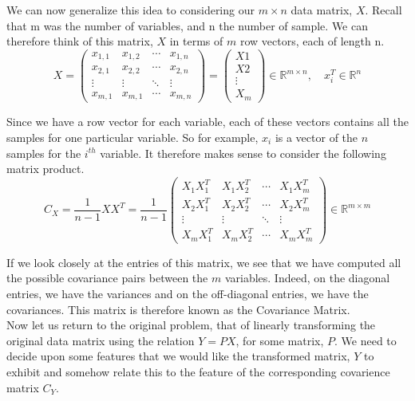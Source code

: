 \begin{appendix}
We can now generalize this idea to considering our $m \times n$ data matrix, $X$. Recall that m was the number of variables, and n the number of sample. We can therefore think of this matrix, $X$ in terms of $m$ row vectors, each of length n.\\
\begin{equation*}
X
=
\begin{pmatrix}
x_{1,1}&x_{1,2}&\cdots&x_{1,n}\\
x_{2,1}&x_{2,2}&\cdots&x_{2,n}\\
\vdots&\vdots&\ddots&\vdots\\
x_{m,1}&x_{m,1}&\cdots&x_{m,n}
\end{pmatrix} 
=
\begin{pmatrix}
X1\\
X2\\
\vdots\\
X_{m}
\end{pmatrix}
\in \mathbb{R}^{m\times n},\quad x_{i}^{T} \in \mathbb{R}^{n}
\end{equation*}

Since we have a row vector for each variable, each of these vectors contains all the samples for one particular variable. So for example, $x_{i}$ is a vector of the $n$ samples for the $i^{th}$ variable. It therefore makes sense to consider the following matrix product.\\
\begin{equation*}
C_{X}=\dfrac{1}{n-1}XX^{T}=\dfrac{1}{n-1}\begin{pmatrix}
X_{1}X_{1}^{T}&X_{1}X_{2}^{T}&\cdots &X_{1}X_{m}^{T}\\
X_{2}X_{1}^{T}&X_{2}X_{2}^{T}&\cdots &X_{2}X_{m}^{T}\\
\vdots &\vdots &\ddots &\vdots \\
X_{m}X_{1}^{T}&X_{m}X_{2}^{T}&\cdots &X_{m}X_{m}^{T}
\end{pmatrix}
\in \mathbb{R}^{m\times m}
\end{equation*}

If we look closely at the entries of this matrix, we see that we have computed all the possible covariance pairs between the $m$ variables. Indeed, on the diagonal entries, we have the variances and on the off-diagonal entries, we have the covariances. This matrix is therefore known as the Covariance Matrix.\\

Now let us return to the original problem, that of linearly transforming the original data matrix using the relation $Y=PX$, for some matrix, $P$. We need to decide upon some features that we would like the transformed matrix, $Y$ to exhibit and somehow relate this to the feature of the corresponding covarience matrix $C_{Y}$.\\


\end{appendix}
